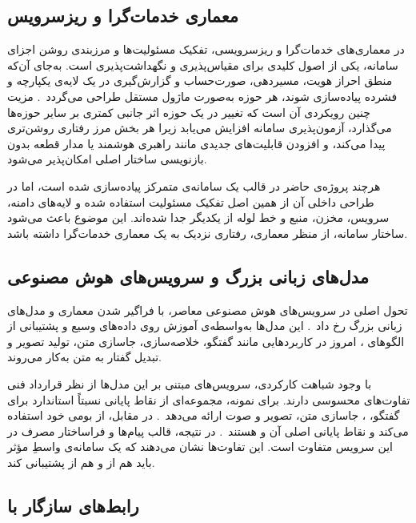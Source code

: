 \subsection{معماری خدمات‌گرا و ریزسرویس}

در معماری‌های خدمات‌گرا و ریزسرویسی، تفکیک مسئولیت‌ها و مرزبندی روشن
اجزای سامانه، یکی از اصول کلیدی برای مقیاس‌پذیری و نگهداشت‌پذیری است.
به‌جای آن‌که منطق احراز هویت، مسیردهی، صورت‌حساب و گزارش‌گیری در یک لایه‌ی
یکپارچه و فشرده پیاده‌سازی شوند، هر حوزه به‌صورت ماژول مستقل طراحی
می‌گردد~\cite{newman2015,richardson2018}. مزیت چنین رویکردی آن است که
تغییر در یک حوزه اثر جانبی کمتری بر سایر حوزه‌ها می‌گذارد، آزمون‌پذیری
سامانه افزایش می‌یابد زیرا هر بخش مرز رفتاری روشن‌تری پیدا می‌کند، و
افزودن قابلیت‌های جدیدی مانند راهبری هوشمند یا مدار قطعه بدون بازنویسی
ساختار اصلی امکان‌پذیر می‌شود.

هرچند پروژه‌ی حاضر در قالب یک سامانه‌ی متمرکز  پیاده‌سازی شده
است، اما در طراحی داخلی آن از همین اصل تفکیک مسئولیت استفاده شده و
لایه‌های دامنه، سرویس، مخزن، منبع و خط لوله از یکدیگر جدا شده‌اند. این
موضوع باعث می‌شود ساختار سامانه، از منظر معماری، رفتاری نزدیک به یک
معماری خدمات‌گرا داشته باشد.

\subsection{مدل‌های زبانی بزرگ و سرویس‌های هوش مصنوعی}

تحول اصلی در سرویس‌های هوش مصنوعی معاصر، با فراگیر شدن معماری
 و مدل‌های زبانی بزرگ رخ داد~\cite{vaswani2017}.
این مدل‌ها به‌واسطه‌ی آموزش روی داده‌های وسیع و پشتیبانی از الگوهای
، امروز در کاربردهایی مانند گفتگو، خلاصه‌سازی،
جاسازی متن، تولید تصویر و تبدیل گفتار به متن به‌کار می‌روند.

با وجود شباهت کارکردی، سرویس‌های مبتنی بر این مدل‌ها از نظر قرارداد
فنی تفاوت‌های محسوسی دارند. برای نمونه،  مجموعه‌ای از نقاط
پایانی نسبتاً استاندارد برای گفتگو، ، جاسازی متن، تصویر و
صوت ارائه می‌دهد~\cite{openai2024}. در مقابل،  از 
بومی خود استفاده می‌کند و نقاط پایانی اصلی آن  و
 هستند~\cite{gemini2024}. در نتیجه، قالب پیام‌ها و
فراساختار مصرف در این سرویس متفاوت است. این تفاوت‌ها نشان می‌دهند که
یک سامانه‌ی واسطِ مؤثر باید هم از
 و هم از
 پشتیبانی کند.

\subsection{رابط‌های سازگار با }

